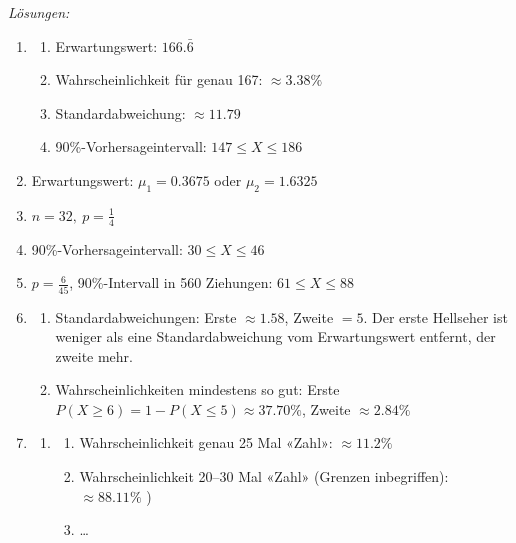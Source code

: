 \clearpage
\emph{Lösungen:}
\begin{enumerate}
    \item
          \begin{enumerate}
              \item Erwartungswert: \(166.\bar{6}\)
              \item Wahrscheinlichkeit für genau 167: \(\approx 3.38\%\)
              \item Standardabweichung: \(\approx 11.79\)
              \item 90\%-Vorhersageintervall: \(147 \le X \le 186\)
          \end{enumerate}

    \item Erwartungswert: \(\mu_1 = 0.3675\) oder \(\mu_2 = 1.6325\)

    \item \(n = 32,\ p = \frac{1}{4}\)

    \item 90\%-Vorhersageintervall: \(30 \le X \le 46\)

    \item \(p= \frac{6}{45}\), 90\%-Intervall in 560 Ziehungen: \(61 \le X \le 88\)


    \item
          \begin{enumerate}
              \item Standardabweichungen: Erste \(\approx 1.58\), Zweite \(= 5\). Der erste Hellseher ist weniger als eine Standardabweichung vom Erwartungswert entfernt, der zweite mehr.
              \item Wahrscheinlichkeiten mindestens so gut: Erste \(P(X\ge6) = 1- P(X\le5) \approx 37.70\%\), Zweite \(\approx 2.84\%\)
          \end{enumerate}

    \item
          \begin{enumerate}
              \item
                    \begin{enumerate}
                        \item Wahrscheinlichkeit genau 25 Mal «Zahl»: \(\approx 11.2\%\)
                        \item Wahrscheinlichkeit 20–30 Mal «Zahl» (Grenzen inbegriffen): \(\approx 88.11\%\) )
                        \item \dots
                    \end{enumerate}


\end{enumerate}
\end{enumerate}
